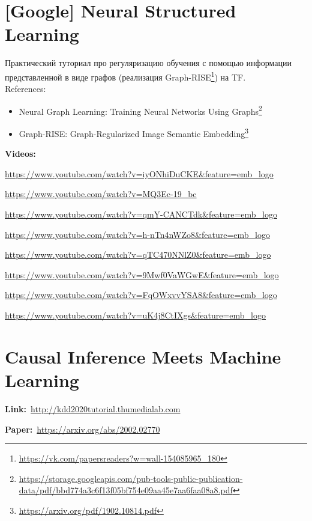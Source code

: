 
\section*{[Google] Neural Structured Learning} 

Практический туториал про регуляризацию обучения с помощью информации представленной в виде графов (реализация Graph-RISE\footnote{\url{https://vk.com/papersreaders?w=wall-154085965_180}}) на TF. \\

References:

\begin{itemize}
    \item Neural Graph Learning: Training Neural Networks Using Graphs\footnote{\url{https://storage.googleapis.com/pub-tools-public-publication-data/pdf/bbd774a3c6f13f05bf754e09aa45e7aa6faa08a8.pdf}}
	\item Graph-RISE: Graph-Regularized Image Semantic Embedding\footnote{\url{https://arxiv.org/pdf/1902.10814.pdf}}
\end{itemize}

\textbf{Videos:}

\url{https://www.youtube.com/watch?v=iyONhiDuCKE&feature=emb_logo}

\url{https://www.youtube.com/watch?v=MQ3Ec-19_bc}

\url{https://www.youtube.com/watch?v=qmY-CANCTdk&feature=emb_logo}

\url{https://www.youtube.com/watch?v=h-nTn4nWZo8&feature=emb_logo}

\url{https://www.youtube.com/watch?v=qTC470NNlZ0&feature=emb_logo}

\url{https://www.youtube.com/watch?v=9Mwf0VaWGwE&feature=emb_logo}

\url{https://www.youtube.com/watch?v=FqOWxvvYSA8&feature=emb_logo}

\url{https://www.youtube.com/watch?v=uK4j8CtIXgs&feature=emb_logo}


\section*{Causal Inference Meets Machine Learning} 

\textbf{Link:}~\url{http://kdd2020tutorial.thumedialab.com}

\textbf{Paper:}~\url{https://arxiv.org/abs/2002.02770} \\

